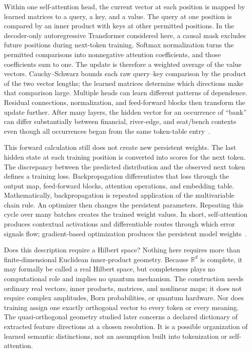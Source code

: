 \documentclass[
  aps,
  reprint,
  superscriptaddress,
  floatfix,
  nofootinbib,
  longbibliography
]{revtex4-2}
\newcommand{\R}{\mathbb{R}}
\begin{document}
Within one self-attention head, the current vector at each position is mapped
by learned matrices to a query, a key, and a value.  The query at one position
is compared by an inner product with keys at other permitted positions.  In
the decoder-only autoregressive Transformer considered here, a causal mask
excludes future positions during next-token training.  Softmax normalization
turns the permitted comparisons into nonnegative attention coefficients, and
those coefficients sum to one.  The update is therefore a weighted average of
the value vectors.  Cauchy--Schwarz bounds each raw query--key comparison by the
product of the two vector lengths; the learned matrices determine which
directions make that comparison large.
Multiple heads can learn different patterns of dependence.  Residual
connections, normalization, and feed-forward blocks then transform the update
further.  After many layers, the hidden vector for an occurrence of ``bank''
can differ substantially between financial, river-edge, and seat/bench
contexts even though all occurrences began from the same token-table
entry~\cite{Vaswani-2017-Attention}.

This forward calculation still does not create new persistent weights.  The
last hidden state at each training position is converted into scores for the
next token.  The discrepancy between the predicted distribution and the
observed next token defines a training loss.  Backpropagation differentiates
that loss through the output map, feed-forward blocks, attention operations,
and embedding table.  Mathematically, backpropagation is repeated application
of the multivariable chain rule.  An optimizer then changes the persistent
parameters.
Repeating this cycle over many batches creates the trained weight values.  In
short, self-attention produces contextual activations and differentiable
routes through which error signals flow; gradient-based optimization produces
the persistent model weights~\cite{Goodfellow-et-al-2016-Book}.

Does this description require a Hilbert space?  Nothing here requires more
than finite-dimensional Euclidean inner-product geometry.  Because $\R^d$ is
complete, it may formally be called a real Hilbert space, but completeness
plays no computational role and implies no quantum mechanism.  The
construction needs ordinary real vectors, inner products, matrices, and
nonlinear maps; it does not require complex amplitudes, Born probabilities, or
quantum hardware.  Nor does training assign one exactly orthogonal vector to
every token or every meaning.  The quasi-orthogonal geometry studied later
concerns a declared dictionary of extracted feature directions at a chosen
resolution.  It is a possible organization of learned semantic distinctions,
not an assumption built into tokenization or self-attention.
\end{document}
